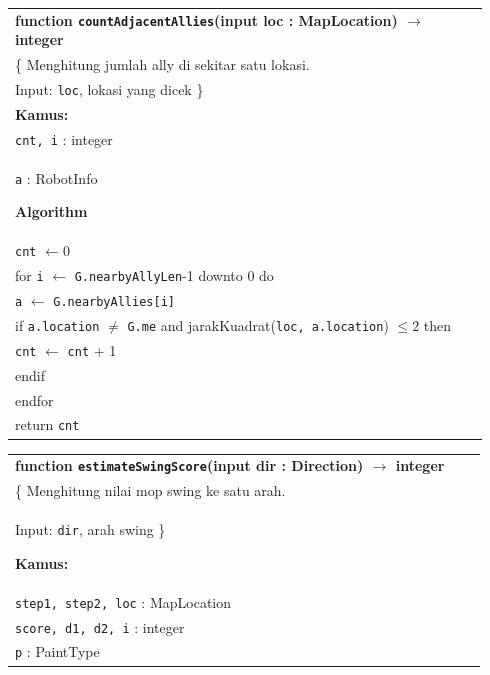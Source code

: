 \documentclass{article}
\newenvironment{pseudobox}
{
\centering
\begin{longtable}{|p{0.94\linewidth}|}
\hline
}
{
\\ \hline
\end{longtable}
\vspace{0.05cm}
}
\begin{document}
\begin{enumerate}[label=\alph*.]
\begin{enumerate}[label=\alph*.]
\begin{pseudobox}
\textbf{function \texttt{countAdjacentAllies}(input loc : MapLocation) $\rightarrow$ integer} \\
\{ Menghitung jumlah ally di sekitar satu lokasi. \\
Input: \texttt{loc}, lokasi yang dicek
\} \\

\textbf{Kamus:} \\
\hspace*{1.5em}\texttt{cnt, i} : integer \\
\hspace*{1.5em}\texttt{a} : RobotInfo

\textbf{Algorithm} \\
\hspace*{1.5em}\texttt{cnt} $\leftarrow 0$ \\
\hspace*{1.5em}for \texttt{i} $\leftarrow$ \texttt{G.nearbyAllyLen}-1 downto 0 do \\
\hspace*{3em}\texttt{a} $\leftarrow$ \texttt{G.nearbyAllies[i]} \\
\hspace*{3em}if \texttt{a.location} $\neq$ \texttt{G.me} and jarakKuadrat(\texttt{loc, a.location}) $\leq 2$ then \\
\hspace*{4.5em}\texttt{cnt} $\leftarrow$ \texttt{cnt} + 1 \\
\hspace*{3em}endif \\
\hspace*{1.5em}endfor \\
\hspace*{1.5em}return \texttt{cnt}
\end{pseudobox}

\begin{pseudobox}
\textbf{function \texttt{estimateSwingScore}(input dir : Direction) $\rightarrow$ integer} \\
\{ Menghitung nilai mop swing ke satu arah. \\
Input: \texttt{dir}, arah swing
\}

\textbf{Kamus:} \\
\hspace*{1.5em}\texttt{step1, step2, loc} : MapLocation \\
\hspace*{1.5em}\texttt{score, d1, d2, i} : integer \\
\hspace*{1.5em}\texttt{p} : PaintType


\end{pseudobox}
\end{enumerate}
\end{enumerate}
\end{document}
